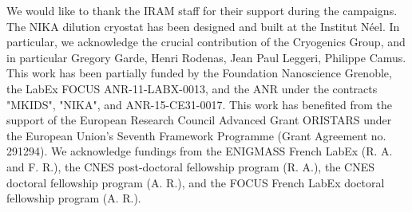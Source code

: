 \documentclass[traditabstract]{aa}
\begin{document}
\begin{acknowledgements}
We would like to thank the IRAM staff for their support during the campaigns. 
The NIKA dilution cryostat has been designed and built at the Institut N\'eel. 
In particular, we acknowledge the crucial contribution of the Cryogenics Group, and 
in particular Gregory Garde, Henri Rodenas, Jean Paul Leggeri, Philippe Camus. 
This work has been partially funded by the Foundation Nanoscience Grenoble, the LabEx FOCUS ANR-11-LABX-0013, and 
the ANR under the contracts "MKIDS", "NIKA", and ANR-15-CE31-0017. 
This work has benefited from the support of the European Research Council Advanced Grant ORISTARS 
under the European Union's Seventh Framework Programme (Grant Agreement no. 291294).
We acknowledge fundings from the ENIGMASS French LabEx (R. A. and F. R.), 
the CNES post-doctoral fellowship program (R. A.),  the CNES doctoral fellowship program (A. R.), and 
the FOCUS French LabEx doctoral fellowship program (A. R.).
\end{acknowledgements}
\end{document}

